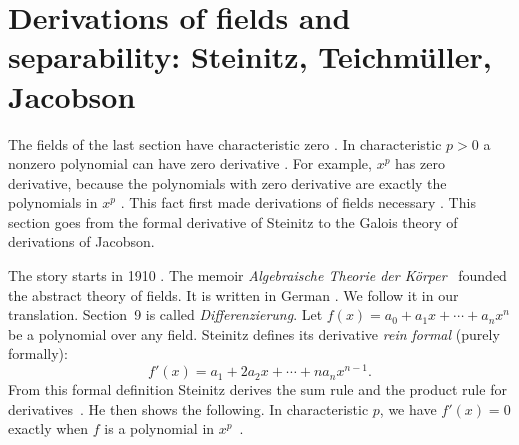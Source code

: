 \section[Derivations of fields and separability: Steinitz, Teichm\"uller, Jacobson][Fields and separability]{Derivations of fields and separability: Steinitz, Teichm\"uller, Jacobson}\label{sec:origins:fields-and-separability}

The fields of the last section have characteristic zero \cite[\S 9,
p.~213]{Steinitz1910}. In characteristic $p > 0$ a nonzero polynomial can have
zero derivative \cite[\S 9, p.~213]{Steinitz1910}. For example, $x^p$ has zero
derivative, because the polynomials with zero derivative are exactly the
polynomials in $x^p$ \cite[\S 9, p.~213]{Steinitz1910}. This fact first made
derivations of fields necessary \cite[\S 9, p.~213]{Steinitz1910}. This
section goes from the formal derivative of Steinitz to the Galois theory of
derivations of Jacobson.

The story starts in 1910 \cite{Steinitz1910}. The memoir \emph{Algebraische Theorie der K\"orper}~\cite{Steinitz1910}
founded the abstract theory of fields. It is written in German \cite{Steinitz1910}. We follow it
in our translation. Section~9 is called \emph{Differenzierung}. Let
$f(x) = a_0 + a_1x + \cdots + a_nx^n$ be a polynomial over any field.
Steinitz defines its derivative \emph{rein formal} (purely formally):
\[
  f'(x) = a_1 + 2a_2x + \cdots + na_nx^{n-1}.
\]
From this formal definition Steinitz derives the sum rule and the product
rule for derivatives~\cite[\S 9, pp.~209--210]{Steinitz1910}. He then shows the following.
In characteristic $p$, we have $f'(x) = 0$ exactly when $f$ is a polynomial
in $x^p$~\cite[\S 9, p.~213]{Steinitz1910}.

